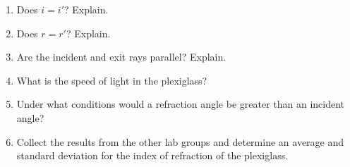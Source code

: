 \begin{enumerate}[labparts]
\item Does $i = i'$? Explain.
\answerspace{20mm}

\item Does $r = r'$? Explain.
\answerspace{20mm}

\item Are the incident and exit rays parallel? Explain.
\answerspace{20mm}

\item What is the speed of light in the plexiglass?
\answerspace{20mm}

\item Under what conditions would a refraction angle be greater than an
incident angle?
\answerspace{20mm}

\item Collect the results from the other lab groups and determine an average 
and standard deviation for the index of refraction of the plexiglass.
\end{enumerate}

